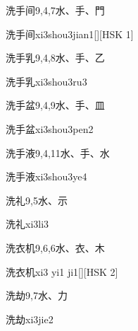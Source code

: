 \begin{entry}{洗手间}{9,4,7}{⽔、⼿、⾨}
  \begin{phonetics}{洗手间}{xi3shou3jian1}[][HSK 1]
  \end{phonetics}
\end{entry}

\begin{entry}{洗手乳}{9,4,8}{⽔、⼿、⼄}
  \begin{phonetics}{洗手乳}{xi3shou3ru3}
  \end{phonetics}
\end{entry}

\begin{entry}{洗手盆}{9,4,9}{⽔、⼿、⽫}
  \begin{phonetics}{洗手盆}{xi3shou3pen2}
  \end{phonetics}
\end{entry}

\begin{entry}{洗手液}{9,4,11}{⽔、⼿、⽔}
  \begin{phonetics}{洗手液}{xi3shou3ye4}
  \end{phonetics}
\end{entry}

\begin{entry}{洗礼}{9,5}{⽔、⽰}
  \begin{phonetics}{洗礼}{xi3li3}
  \end{phonetics}
\end{entry}

\begin{entry}{洗衣机}{9,6,6}{⽔、⾐、⽊}
  \begin{phonetics}{洗衣机}{xi3 yi1 ji1}[][HSK 2]
  \end{phonetics}
\end{entry}

\begin{entry}{洗劫}{9,7}{⽔、⼒}
  \begin{phonetics}{洗劫}{xi3jie2}
  \end{phonetics}
\end{entry}

